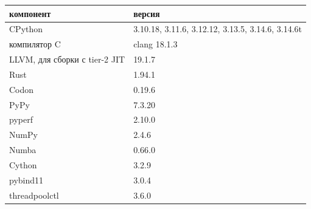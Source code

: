 \begin{tabular}{ll}
\toprule
компонент & версия \\
\midrule
CPython & 3.10.18, 3.11.6, 3.12.12, 3.13.5, 3.14.6, 3.14.6t \\
компилятор C & clang 18.1.3 \\
LLVM, для сборки с tier-2 JIT & 19.1.7 \\
Rust & 1.94.1 \\
Codon & 0.19.6 \\
PyPy & 7.3.20 \\
pyperf & 2.10.0 \\
NumPy & 2.4.6 \\
Numba & 0.66.0 \\
Cython & 3.2.9 \\
pybind11 & 3.0.4 \\
threadpoolctl & 3.6.0 \\
\bottomrule
\end{tabular}
